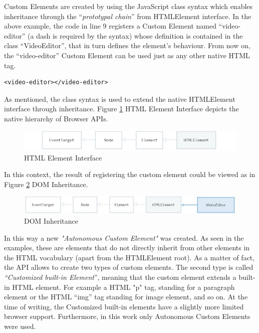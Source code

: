 Custom Elements are created by using the JavaScript class syntax which enables inheritance through the “\emph{prototypal chain}” from HTMLElement interface. In the above example, the code in line 9 registers a Custom Element named “video-editor” (a dash is required by the syntax) whose definition is contained in the class “VideoEditor”, that in turn defines the element’s behaviour.
From now on, the “video-editor” Custom Element can be used just as any other native HTML tag.
\\
\begin{lstlisting}[caption={Custom Element usage},label={codeCustomElemUse}, language=HTML5, numbers=none]
<video-editor></video-editor>
\end{lstlisting}

As mentioned, the class syntax is used to extend the native HTMLElement interface through inheritance. Figure \ref{fig:HTMLInheritance1} HTML Element Interface depicts the native hierarchy of Browser APIs.

\begin{figure}[H]
\centering
\includegraphics[width=1\textwidth]{images/HTMLElement - Web APIs MDN.png}
\caption{HTML Element Interface}
\label{fig:HTMLInheritance1}
\end{figure}

In this context, the result of registering the custom element could be viewed as in Figure \ref{fig:HTMLInheritance2} DOM Inheritance.

\begin{figure}[H]
\centering
\includegraphics[width=1\textwidth]{images/inherit.jpg}
\caption{DOM Inheritance}
\label{fig:HTMLInheritance2}
\end{figure}

In this way a new \emph{"Autonomous Custom Element"} was created. As seen in the examples, these are elements that do not directly inherit from other elements in the HTML vocabulary (apart from the HTMLElement root). As a matter of fact, the API allows to create two types of custom elements. The second type is called \emph{“Customized built-in Element}”, meaning that the custom element extends a built-in HTML element. For example a HTML "p" tag, standing for a paragraph element or the HTML “img” tag standing for image element, and so on.
At the time of writing, the Customized built-in elements have a slightly more limited browser support. Furthermore, in this work only Autonomous Custom Elements were used. 

